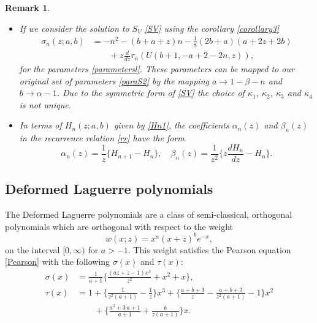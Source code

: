 \documentclass[12pt]{article}
\newtheorem{mydef3}{Remark}[section]
\numberwithin{figure}{section}
\numberwithin{equation}{section}
\numberwithin{table}{section}
\begin{document}
\begin{mydef3}
{\quad \phantom{x}
\begin{itemize}
\item
If we consider the solution to $S_V$ \eqref{SV} using the corollary \eqref{corollary3}
\begin{align*}
\sigma_n(z; a, b)&=-n^2-( b+ a+z)n-\tfrac{1}{8}(2 b+ a)( a+2z+2 b)\\
&\qquad+z\frac{d}{dz}\tau_{n}(U( b+1,- a+2-2n,z)),
\end{align*}
for the parameters \eqref{parametersl}. These parameters can be mapped to our original set of parameters  \eqref{paraS2} by the mapping $ a\rightarrow 1- \beta-n$ and $ b\rightarrow
 \alpha-1$. Due to the symmetric form of \eqref{SV} the choice of $\kappa_1$, $\kappa_2$, $\kappa_3$ and $\kappa_4$ is not unique.
\item
In terms of $H_n(z; a, b)$ given by \eqref{Hn1}, the coefficients $\alpha_n(z)$ and $\beta_n(z)$ in the recurrence relation \eqref{rr} have the
form
\begin{equation}\nonumber
\alpha_n(z)=\frac{1}{z}\bigg\{H_{n+1}-H_n\bigg\},\quad
\beta_n(z)=\frac{1}{z^2}\bigg\{z\frac{dH_n}{dz}-H_{n}\bigg\}.
\end{equation}
\end{itemize}}
\end{mydef3}

\subsection{Deformed Laguerre polynomials}
The Deformed Laguerre  polynomials are a class of semi-classical, orthogonal polynomials which are orthogonal with respect to the weight
\begin{equation}
w(x;z)=x^ a(x+z)^ b e^{-x},\label{weight5}
\end{equation}
on the interval $[0,\infty)$ for $ a>{-1}$. This weight satisfies the Pearson equation \eqref{Pearson} with the following $\sigma(x)$ and $\tau(x)$:
\begin{align*}
\sigma(x)&=\frac{1}{a+1}\bigg\{{\frac { ( az+z-1 ) {x}^{3}}{{z}^{2}  }}+
{x}^{2}+{ {x}}\bigg\},\\
\tau(x)&=1+ \bigg\{ {\frac {1}{{z}^{2} ( a+1 ) }}-\frac{1}{z} \bigg\} {
x}^{3}+ \bigg\{{\frac {a+b+3}{z}}-{\frac {a+b+3}{{z}^{2} ( a+1
 ) }} -1\bigg\} {x}^{2}\\
 &\qquad+\bigg\{ {\frac {{a}^{2}+3\,a+1}{a+1}}+{
\frac {b}{z ( a+1 ) }} \bigg\} x.
\end{align*}
\end{document}

